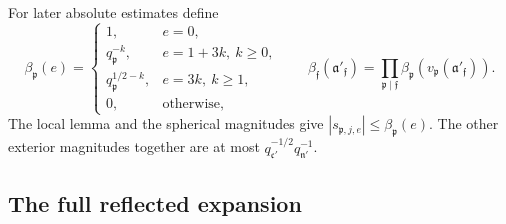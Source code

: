 For later absolute estimates define
\begin{equation}\label{eq:reflection-frozen-weight}
 \beta_{\mathfrak p}(e)=
 \begin{cases}
  1,&e=0,\\
  q_{\mathfrak p}^{-k},&e=1+3k,\ k\ge0,\\
  q_{\mathfrak p}^{1/2-k},&e=3k,\ k\ge1,\\
  0,&\text{otherwise},
 \end{cases}
 \qquad
 \beta_{\mathfrak f}(\mathfrak a'_{\mathfrak f})
    =\prod_{\mathfrak p\mid\mathfrak f}
       \beta_{\mathfrak p}(v_{\mathfrak p}(\mathfrak a'_{\mathfrak f})).
\end{equation}
The local lemma and the spherical magnitudes give
\(|s_{\mathfrak p,j,e}|\le\beta_{\mathfrak p}(e)\).  The other exterior
magnitudes together are at most
\(q_{\mathfrak c'}^{-1/2}q_{\mathfrak n'}^{-1}\).

\subsection{The full reflected expansion}

